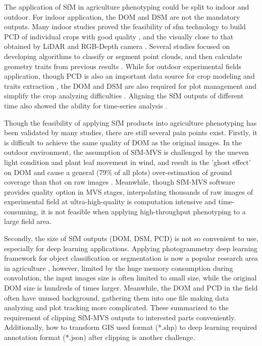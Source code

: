\documentclass{configs/bmcart}
\begin{document}
The application of SfM in agriculture phenotyping could be split to indoor and outdoor. For indoor application, the DOM and DSM are not the mandatory outputs. Many indoor studies proved the feasibility of \acrshort*{sfm} technology to build PCD of individual crops with good quality \cite{wang_maize_2019, rossi_performances_2020}, and the visually close to that obtained by LiDAR \cite{thapa_novel_2018} and RGB-Depth camera \cite{martinez-guanter_low-cost_2019}. Several studies focused on developing algorithms to classify or segment point clouds, and then calculate geometry traits from previous results \cite{ziamtsov_machine_2019, artzet_phenomenal_2019}. While for outdoor experimental fields application, though PCD is also an important data source for crop modeling and traits extraction \cite{jay_-field_2015, sun_three-dimensional_2020, zhu_quantification_2020}, the DOM and DSM are also required for plot management and simplify the crop analyzing difficulties \cite{sun_field_2018, tresch_easympe_2019, chen_grid_2020}. Aligning the SfM outputs of different time also showed the ability for time-series analysis \cite{dong_4d_2017, han_clustering_2018}.

Though the feasibility of applying SfM products into agriculture phenotyping has been validated by many studies, there are still several pain points exist. Firstly, it is difficult to achieve the same quality of DOM as the original images. In the outdoor environment, the assumption of SfM-MVS is challenged by the uneven light condition and plant leaf movement in wind, and result in the 'ghost effect' on DOM and cause a general (79\% of all plots) over-estimation of ground coverage than that on raw images \cite{duan_comparison_2017}. Meanwhile, though SfM-MVS software provides quality option in MVS stages, interpolating thousands of raw images of experimental field at ultra-high-quality is computation intensive and time-consuming, it is not feasible when applying high-throughput phenotyping to a large field area. 

Secondly, the size of SfM outputs (DOM, DSM, PCD) is not so convenient to use, especially for deep learning applications. Applying photogrammetry deep learning framework for object classification or segmentation is now a popular research area in agriculture \cite{zhou_fast_2020, feng_evaluation_2020, desai_automatic_2019}, however, limited by the huge memory consumption during convolution, the input images size is often limited to small size, while the original DOM size is hundreds of times larger. Meanwhile, the DOM and PCD in the field often have unused background, gathering them into one file making data analyzing and plot tracking more complicated. These summarized to the requirement of clipping SfM-MVS outputs to interested parts conveniently. Additionally, how to transform GIS used format (*.shp) to deep learning required annotation format (*.json) after clipping is another challenge. 
\end{document}
